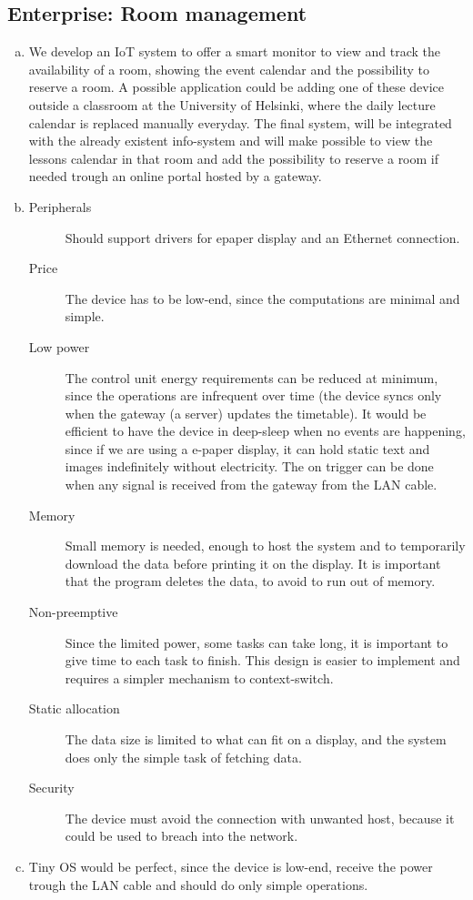 \documentclass[a4paper, 12pt]{article}
\begin{document}
\begin{exercise}

\subsection{Enterprise: Room management} %
\label{sub:enterprise_room_management}
\begin{enumerate}[(a)]
    \item We develop an IoT system to offer a smart monitor to
		view and track the availability of a room, showing the event calendar
		and the possibility to reserve a room. A possible application could
		be adding one of these device outside a classroom at the University of
		Helsinki, where the daily lecture calendar is replaced manually
		everyday. The final system, will be integrated with the already existent
		info-system and will make possible to view the lessons calendar in that room
		and add the possibility to reserve a room
		if needed trough an online portal hosted by a gateway. 
	\item
		\begin{description}
		    \item[Peripherals] Should support drivers for epaper display and 
				an Ethernet connection.
			\item[Price] The device has to be low-end, since the computations are 
				minimal and simple. 
			\item[Low power] The control unit energy requirements can be reduced
				at minimum, since the operations are infrequent over time (the
				device syncs only when the gateway (a server) updates the
				timetable). It would be efficient to have the device in
				deep-sleep when no events are happening, since if we are using
				a e-paper display, it can hold static text
				and images indefinitely without electricity. The on trigger can
				be done when any signal is received from the gateway from the
				LAN cable.
			\item[Memory] Small memory is needed, enough to host the system and
				to temporarily download the data before printing it on the
				display. It is important that the program deletes the data, to
				avoid to run out of memory.
			\item[Non-preemptive] Since the limited power, some tasks can take
				long, it is important to give time to each task to finish.
				This design is easier to implement and requires a simpler
				mechanism to context-switch.
			\item[Static allocation] The data size is limited to what can fit on
				a display, and the system does only the simple task of fetching
				data. 
			\item[Security] The device must avoid the connection with unwanted
				host, because it could be used to breach into the network.
		\end{description}
	\item Tiny OS would be perfect, since the device is low-end, receive the
		power trough the LAN cable and should do only simple operations.
\end{enumerate}




\end{exercise}
\end{document}
